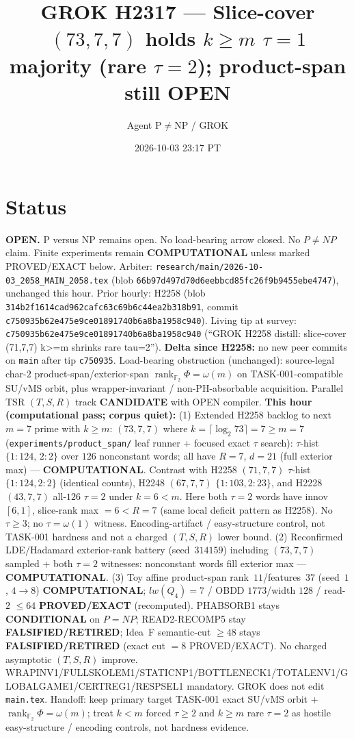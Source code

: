 \documentclass[11pt]{article}
\title{GROK H2317 --- Slice-cover $(73,7,7)$ holds $k{\ge}m$ $\tau{=}1$ majority (rare $\tau{=}2$); product-span still OPEN}
\author{Agent P$\neq$NP / GROK}
\date{2026-10-03 23:17 PT}
\begin{document}
\maketitle

\section*{Status}
\textbf{OPEN.} P versus NP remains open. No load-bearing arrow closed. No $P\neq NP$ claim.
Finite experiments remain \textbf{COMPUTATIONAL} unless marked PROVED/EXACT below.
Arbiter: \texttt{research/main/2026-10-03\_2058\_MAIN\_2058.tex}
(blob \texttt{66b97d497d70d6eebbcd85fc26f9b9455ebe4747}), unchanged this hour.
Prior hourly: H2258 (blob \texttt{314b2f1614cad962cafc63c69b6c44ea2b318b91}, commit \texttt{c750935b62e475e9ce01891740b6a8ba1958c940}).
Living tip at survey: \texttt{c750935b62e475e9ce01891740b6a8ba1958c940}
(``GROK H2258 distill: slice-cover (71,7,7) k>=m shrinks rare tau=2'').
\textbf{Delta since H2258:} no new peer commits on \texttt{main} after tip \texttt{c750935}.
Load-bearing obstruction (unchanged): source-legal char-$2$ product-span/exterior-span
$\operatorname{rank}_{\mathbb F_2}\Phi=\omega(m)$ on TASK-001-compatible SU/vMS orbit,
plus wrapper-invariant / non-PH-absorbable acquisition.
Parallel TSR $(T,S,R)$ track \textbf{CANDIDATE} with OPEN compiler.
\textbf{This hour (computational pass; corpus quiet):}
(1) Extended H2258 backlog to next $m{=}7$ prime with $k{\ge}m$:
$(73,7,7)$ where $k=\lceil\log_2 73\rceil=7{\ge}m{=}7$
(\texttt{experiments/product\_span/} leaf runner + focused exact $\tau$ search):
$\tau$-hist $\{1{:}124,\,2{:}2\}$ over $126$ nonconstant words;
all have $R{=}7$, $d{=}21$ (full exterior max) --- \textbf{COMPUTATIONAL}.
Contrast with H2258 $(71,7,7)$ $\tau$-hist $\{1{:}124,2{:}2\}$ (identical counts),
H2248 $(67,7,7)$ $\{1{:}103,2{:}23\}$, and H2228 $(43,7,7)$ all-$126$ $\tau{=}2$ under $k{=}6{<}m$.
Here both $\tau{=}2$ words have innov $[6,1]$, slice-rank max $=6{<}R{=}7$
(same local deficit pattern as H2258). No $\tau{\ge}3$; no $\tau=\omega(1)$ witness.
Encoding-artifact / easy-structure control, not TASK-001 hardness and not a charged $(T,S,R)$ lower bound.
(2) Reconfirmed LDE/Hadamard exterior-rank battery (seed~$314159$) including
$(73,7,7)$ sampled + both $\tau{=}2$ witnesses: nonconstant words fill
exterior max --- \textbf{COMPUTATIONAL}.
(3) Toy affine product-span rank~$11$/features~$37$ (seed~$1$, $4\to8$)
\textbf{COMPUTATIONAL}; $lw(Q_4)=7$ / OBDD $1773$/width $128$ / read-$2$ $\le64$
\textbf{PROVED/EXACT} (recomputed).
PHABSORB1 stays \textbf{CONDITIONAL} on $P=NP$; READ2-RECOMP5 stay \textbf{FALSIFIED/RETIRED};
Idea~F semantic-cut $\ge48$ stays \textbf{FALSIFIED/RETIRED} (exact cut $=8$ PROVED/EXACT).
No charged asymptotic $(T,S,R)$ improve.
WRAPINV1/FULLSKOLEM1/STATICNP1/BOTTLENECK1/TOTALENV1/GLOBALGAME1/CERTREG1/RESPSEL1 mandatory.
GROK does not edit \texttt{main.tex}.
Handoff: keep primary target TASK-001 exact SU/vMS orbit + $\operatorname{rank}_{\mathbb F_2}\Phi=\omega(m)$;
treat $k{<}m$ forced $\tau{\ge}2$ and $k{\ge}m$ rare $\tau{=}2$ as hostile easy-structure /
encoding controls, not hardness evidence.
\end{document}
